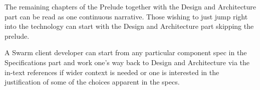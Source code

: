 The remaining chapters of the Prelude together with the Design and Architecture part can be read as one continuous narrative. Those wishing to just jump right into the technology can start with the Design and Architecture part skipping the prelude.

A Swarm client developer can start from any particular component spec in the Specifications part and work one's way back to Design and Architecture via the in-text references if wider context is needed or one is interested in the justification of some of the choices apparent in the specs.

